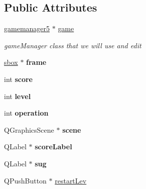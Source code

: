 \subsection*{\-Public \-Attributes}
\begin{DoxyCompactItemize}
\item 
\hypertarget{classrestartwindow_ab7f9be3a780733ab157b5b9097971f75}{\hyperlink{classgamemanager5}{gamemanager5} $\ast$ \hyperlink{classrestartwindow_ab7f9be3a780733ab157b5b9097971f75}{game}}\label{classrestartwindow_ab7f9be3a780733ab157b5b9097971f75}

\begin{DoxyCompactList}\small\item\em game\-Manager class that we will use and edit \end{DoxyCompactList}\item 
\hypertarget{classrestartwindow_a0a977c4dc1af0703b29dbfdd772156fc}{\hyperlink{classsbox}{sbox} $\ast$ {\bfseries frame}}\label{classrestartwindow_a0a977c4dc1af0703b29dbfdd772156fc}

\item 
\hypertarget{classrestartwindow_abfe75dbcfab7ec0da17ec60cc2d259a2}{int {\bfseries score}}\label{classrestartwindow_abfe75dbcfab7ec0da17ec60cc2d259a2}

\item 
\hypertarget{classrestartwindow_a689bd83a45097c198b39c90263b5d08a}{int {\bfseries level}}\label{classrestartwindow_a689bd83a45097c198b39c90263b5d08a}

\item 
\hypertarget{classrestartwindow_a741f26a756e7d790cfb1702f97c4f8a5}{int {\bfseries operation}}\label{classrestartwindow_a741f26a756e7d790cfb1702f97c4f8a5}

\item 
\hypertarget{classrestartwindow_a2478db240e9004452b756ea9bb303d73}{\-Q\-Graphics\-Scene $\ast$ {\bfseries scene}}\label{classrestartwindow_a2478db240e9004452b756ea9bb303d73}

\item 
\hypertarget{classrestartwindow_ac6a36237a4e78fb3bd0ad94c50b0e8e7}{\-Q\-Label $\ast$ {\bfseries score\-Label}}\label{classrestartwindow_ac6a36237a4e78fb3bd0ad94c50b0e8e7}

\item 
\hypertarget{classrestartwindow_ae5cad08f42c14e8be53e93c4c36a1426}{\-Q\-Label $\ast$ {\bfseries sug}}\label{classrestartwindow_ae5cad08f42c14e8be53e93c4c36a1426}

\item 
\hypertarget{classrestartwindow_a68d49a6b8d89cc6dab021c284215846b}{\-Q\-Push\-Button $\ast$ \hyperlink{classrestartwindow_a68d49a6b8d89cc6dab021c284215846b}{restart\-Lev}}\label{classrestartwindow_a68d49a6b8d89cc6dab021c284215846b}


\end{DoxyCompactItemize}

